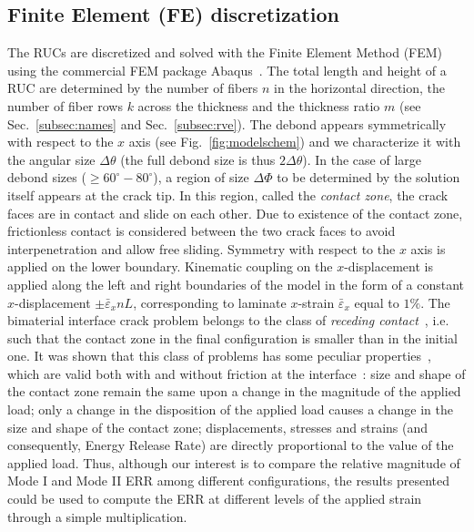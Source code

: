 \documentclass[review]{elsarticle}
\begin{document}

\subsection{Finite Element (FE) discretization}

The RUCs are discretized and solved with the Finite Element Method (FEM) using the commercial FEM package Abaqus~\cite{abq12}. The total length and height of a RUC are determined by the number of fibers $n$ in the horizontal direction, the number of fiber rows $k$ across the thickness and the thickness ratio $m$ (see Sec.~\ref{subsec:names} and Sec.~\ref{subsec:rve}). The debond appears symmetrically with respect to the $x$ axis (see Fig.~\ref{fig:modelschem}) and we characterize it with the angular size $\Delta\theta$ (the full debond size is thus $2\Delta\theta$). In the case of large debond sizes ($\geq 60^{\circ}-80^{\circ}$), a region of size $\Delta\Phi$ to be determined by the solution itself appears at the crack tip. In this region, called the \emph{contact zone}, the crack faces are in contact and slide on each other. Due to existence of the contact zone, frictionless contact is considered between the two crack faces to avoid interpenetration and allow free sliding. Symmetry with respect to the $x$ axis is applied on the lower boundary. Kinematic coupling on the $x$-displacement is applied along the left and right boundaries of the model in the form of a constant $x$-displacement $\pm\bar{\varepsilon}_{x} nL$, corresponding to laminate $x$-strain $\bar{\varepsilon}_{x}$ equal to $1\%$. The bimaterial interface crack problem belongs to the class of \emph{receding contact}~\cite{Paris1996,Garrido1991}, i.e. such that the contact zone in the final configuration is smaller than in the initial one. It was shown that this class of problems has some peculiar properties~\cite{Keer1972,Tsai1974}, which are valid both with and without friction at the interface~\cite{Paris1996,Garrido1991}: size and shape of the contact zone remain the same upon a change in the magnitude of the applied load; only a change in the disposition of the applied load causes a change in the size and shape of the contact zone; displacements, stresses and strains (and consequently, Energy Release Rate) are directly proportional to the value of the applied load. Thus, although our interest is to compare the relative magnitude of Mode I and Mode II ERR among different configurations, the results presented could be used to compute the ERR at different levels of the applied strain through a simple multiplication.\\
\end{document}
